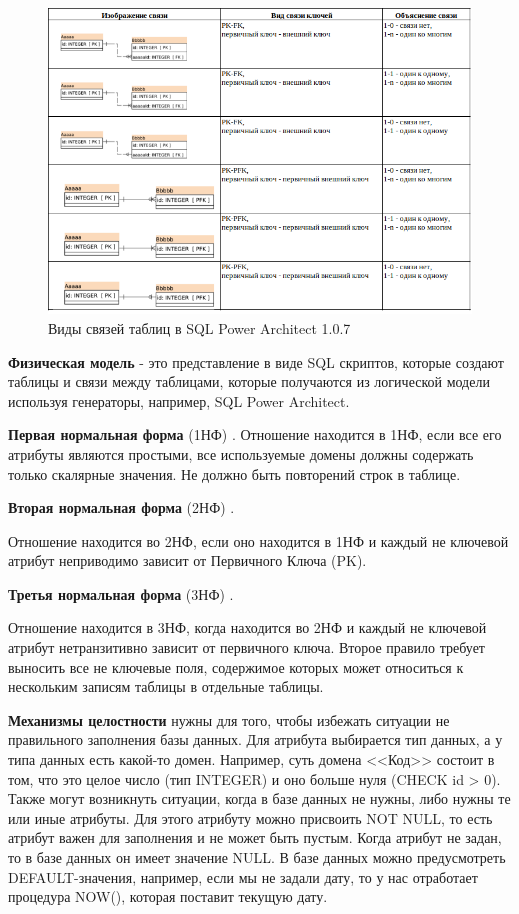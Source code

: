 \begin{figure}[!h]
    \centering

    \includegraphics[width=18cm]
    {assets/database/Relations/RelationsSqlPowerArchitect.png}

    \caption{Виды связей таблиц в SQL Power Architect 1.0.7}

    \label{fig:RelationsSqlPowerArchitect}
\end{figure}

\textbf{Физическая модель} - это представление в виде SQL скриптов, которые создают таблицы и связи между таблицами,
которые получаются из логической модели используя генераторы, например, SQL Power Architect.

\textbf{Первая нормальная форма} (1НФ) \cite{habr_1nf_6nf}.
Отношение находится в 1НФ, если все его атрибуты являются простыми,
все используемые домены должны содержать только скалярные значения.
Не должно быть повторений строк в таблице.

\textbf{Вторая нормальная форма} (2НФ) \cite{habr_1nf_6nf}.

Отношение находится во 2НФ, если оно находится в 1НФ и каждый не ключевой атрибут неприводимо зависит от Первичного Ключа (PK).

\textbf{Третья нормальная форма} (3НФ) \cite{habr_1nf_6nf}.

Отношение находится в 3НФ, когда находится во 2НФ и каждый не ключевой атрибут нетранзитивно зависит от первичного ключа.
Второе правило требует выносить все не ключевые поля, содержимое которых может относиться к нескольким записям таблицы в отдельные таблицы.

\textbf{Механизмы целостности} нужны для того, чтобы избежать ситуации не правильного заполнения базы данных.
Для атрибута выбирается тип данных, а у типа данных есть какой-то домен. Например, суть домена <<Код>> состоит в том,
что это целое число (тип INTEGER) и оно больше нуля (CHECK id > 0).
Также могут возникнуть ситуации, когда в базе данных не нужны, либо нужны те или иные атрибуты.
Для этого атрибуту можно присвоить NOT NULL, то есть атрибут важен для заполнения и не может быть пустым.
Когда атрибут не задан, то в базе данных он имеет значение NULL.
В базе данных можно предусмотреть DEFAULT-значения, например, если мы не задали дату,
то у нас отработает процедура NOW(), которая поставит текущую дату.

